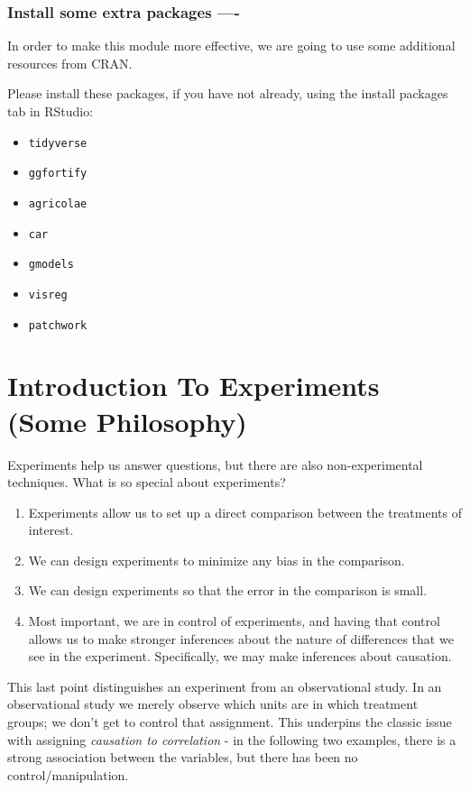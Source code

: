 \documentclass[
]{book}
\providecommand{\tightlist}{%
  \setlength{\itemsep}{0pt}\setlength{\parskip}{0pt}}
\begin{document}
\hypertarget{install-some-extra-packages--}{%
\subsection{Install some extra packages ----}\label{install-some-extra-packages--}}

In order to make this module more effective, we are going to use some additional resources from CRAN.

Please install these packages, if you have not already, using the install packages tab in RStudio:

\begin{itemize}
\tightlist
\item
  \texttt{tidyverse}
\item
  \texttt{ggfortify}
\item
  \texttt{agricolae}
\item
  \texttt{car}
\item
  \texttt{gmodels}
\item
  \texttt{visreg}
\item
  \texttt{patchwork}
\end{itemize}

\hypertarget{intro}{%
\chapter{Introduction To Experiments (Some Philosophy)}\label{intro}}

Experiments help us answer questions, but there are also non-experimental techniques. What is so special about experiments?

\begin{enumerate}
\def\labelenumi{\arabic{enumi}.}
\tightlist
\item
  Experiments allow us to set up a direct comparison between the treatments of interest.
\item
  We can design experiments to minimize any bias in the comparison.
\item
  We can design experiments so that the error in the comparison is small.
\item
  Most important, we are in control of experiments, and having that control
  allows us to make stronger inferences about the nature of differences
  that we see in the experiment. Specifically, we may make inferences
  about causation.
\end{enumerate}

This last point distinguishes an experiment from an observational study. In an observational study we merely observe which units are in which treatment groups; we don't get to control that assignment. This underpins the classic issue with assigning \emph{causation to correlation} - in the following two examples, there is a strong association between the variables, but there has been no control/manipulation.
\end{document}
